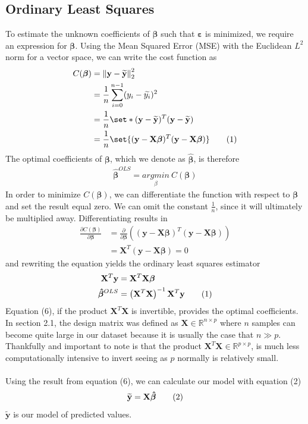 \documentclass[oneside,10pt]{article}
\DeclarePairedDelimiter\set\{\}
\newcommand\numberthis{\addtocounter{equation}{1}\tag{\theequation}}
\newcommand{\R}{\mathbb{R}}
\newcommand{\y}{\mathbf{y}}
\newcommand{\ytilde}{\mathbf{\widetilde{y}}}
\newcommand{\X}{\mathbf{X}}
\newcommand{\B}{\boldsymbol{\beta}}
\newcommand{\Bhat}{\boldsymbol{\hat{\beta}}}
\newcommand{\eps}{\boldsymbol{\varepsilon}}
\newcommand{\norm}[1]{\left\lVert#1\right\rVert}
\begin{document}
\subsection{Ordinary Least Squares}
To estimate the unknown coefficients of $\B$ such that $\eps$ is minimized, we require an expression for $\B$. Using the Mean Squared Error (MSE) with the Euclidean $L^{2}$ norm for a vector space, we can write the cost function as
\begin{align*}
    C(\B) &= \norm{\y - \ytilde}_{2}^{2}\\
    &= \frac{1}{n}\sum_{i=0}^{n - 1} (y_{i} - \widetilde{y_{i}})^{2}\\
    &= \frac{1}{n}\set*{(\y - \ytilde)^{T}(\y - \ytilde)}\\
    &= \frac{1}{n}\set{(\y - \X\B)^{T}(\y - \X\B)}\numberthis\label{eqn}
\end{align*}
The optimal coefficients of $\B$, which we denote as $\Bhat$, is therefore
\begin{align}
    \Bhat^{OLS} = \underset{\beta}{argmin} \ C(\B)
\end{align}
In order to minimize $C(\B)$, we can differentiate the function with respect to $\B$ and set the result equal zero. We can omit the constant $\frac{1}{n}$, since it will ultimately be multiplied away. Differentiating results in
\begin{align*}
    \frac{\partial C(\B)}{\partial \B} &= \frac{\partial}{\partial \B}\left((\y - \X\B)^{T}(\y - \X\B)\right)\\
    &= \X^{T}(\y - \X\B) = 0
\end{align*}
and rewriting the equation yields the ordinary least squares estimator
\begin{align*}
    \X^{T}\y &= \X^{T}\X\B\\
    \Bhat^{OLS} &= \left(\X^{T}\X\right)^{-1}\X^{T}\y \numberthis\label{eqn}
\end{align*}
Equation (6), if the product $\X^{T}\X$ is invertible, provides the optimal coefficients. In section 2.1, the design matrix was defined as $\X \in \R^{n\times p}$ where $n$ samples can become quite large in our dataset because it is usually the case that $n \gg p$. Thankfully and important to note is that the product $\X^{T}\X \in \R^{p \times p}$, is much less computationally intensive to invert seeing as $p$ normally is relatively small.\\
\\
Using the result from equation (6), we can calculate our model with equation (2)
\begin{align*}
    \ytilde = \X\Bhat\numberthis\label{eqn}
\end{align*}
$\ytilde$ is our model of predicted values.
\end{document}

